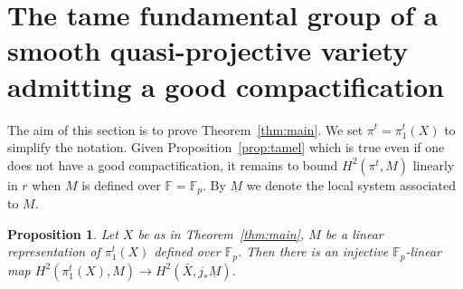\documentclass[12pt]{amsart}
\theoremstyle{plain}
\newtheorem{prop}[thm]{Proposition}
\theoremstyle{definition}
\numberwithin{thm}{section}
\newcommand{\F}{{\mathbb F}}
\numberwithin{equation}{section}
\begin{document}
\section{ The tame fundamental group of a smooth quasi-projective variety admitting a good compactification}

The aim of this section is to prove Theorem~\ref{thm:main}.   We set $\pi^t=\pi^t_1(X)$ to simplify the notation. 
 Given Proposition~\ref{prop:tamel} which is true even if one does not have a good compactification, it remains  to bound 
$H^2(\pi^t, M)$  linearly in $r$  when $M$ is defined over $\F=\F_p$.   By  $\underline{M}$ we denote the local system associated to $M$. 

\begin{prop} \label{prop:numtame}
Let $X$ be as in Theorem~\ref{thm:main}, $M$ be a linear representation of $\pi_1^t(X)$ defined over $\F_p$.  Then there is an injective $\F_p$-linear map $H^2(\pi_1^t(X), M)\to H^2(\bar X, j_*\underline{M})$.

  

\end{prop}
\end{document}
